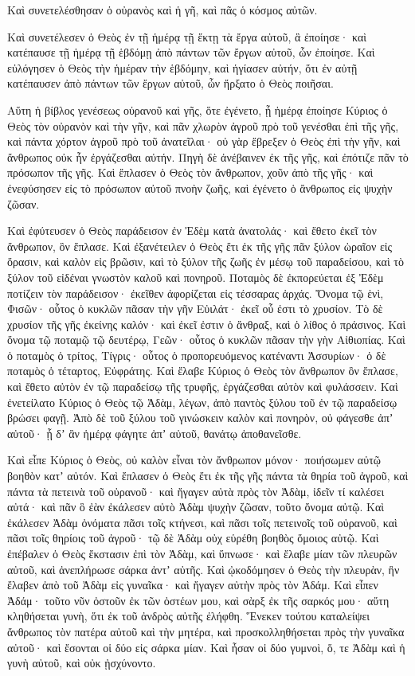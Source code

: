 {Καὶ συνετελέσθησαν ὁ οὐρανὸς καὶ ἡ γῆ, καὶ πᾶς ὁ κόσμος αὐτῶν.
\par }{\PP {}Καὶ συνετέλεσεν ὁ Θεὸς ἐν τῇ ἡμέρᾳ τῇ ἕκτῃ τὰ ἔργα αὐτοῦ, ἃ ἐποίησε· καὶ κατέπαυσε τῇ ἡμέρᾳ τῇ ἑβδόμῃ ἀπὸ πάντων τῶν ἔργων αὐτοῦ, ὧν ἐποίησε.
Καὶ εὐλόγησεν ὁ Θεὸς τὴν ἡμέραν τὴν ἑβδόμην, καὶ ἡγίασεν αὐτήν, ὅτι ἐν αὐτῇ κατέπαυσεν ἀπὸ πάντων τῶν ἔργων αὐτοῦ, ὧν ἤρξατο ὁ Θεὸς ποιῆσαι.
\par }{\PP {}Αὕτη ἡ βίβλος γενέσεως οὐρανοῦ καὶ γῆς, ὅτε ἐγένετο, ᾗ ἡμέρᾳ ἐποίησε Κύριος ὁ Θεὸς τὸν οὐρανὸν καὶ τὴν γῆν,
καὶ πᾶν χλωρὸν ἀγροῦ πρὸ τοῦ γενέσθαι ἐπὶ τῆς γῆς, καὶ πάντα χόρτον ἀγροῦ πρὸ τοῦ ἀνατεῖλαι· οὐ γὰρ ἔβρεξεν ὁ Θεὸς ἐπὶ τὴν γῆν, καὶ ἄνθρωπος οὐκ ἦν ἐργάζεσθαι αὐτήν.
Πηγὴ δὲ ἀνέβαινεν ἐκ τῆς γῆς, καὶ ἐπότιζε πᾶν τὸ πρόσωπον τῆς γῆς.
Καὶ ἔπλασεν ὁ Θεὸς τὸν ἄνθρωπον, χοῦν ἀπὸ τῆς γῆς· καὶ ἐνεφύσησεν εἰς τὸ πρόσωπον αὐτοῦ πνοὴν ζωῆς, καὶ ἐγένετο ὁ ἄνθρωπος εἰς ψυχὴν ζῶσαν.
\par }{\PP {}Καὶ ἐφύτευσεν ὁ Θεὸς παράδεισον ἐν Ἐδὲμ κατὰ ἀνατολάς· καὶ ἔθετο ἐκεῖ τὸν ἄνθρωπον, ὃν ἔπλασε.
Καὶ ἐξανέτειλεν ὁ Θεὸς ἔτι ἐκ τῆς γῆς πᾶν ξύλον ὡραῖον εἰς ὅρασιν, καὶ καλὸν εἰς βρῶσιν, καὶ τὸ ξύλον τῆς ζωῆς ἐν μέσῳ τοῦ παραδείσου, καὶ τὸ ξύλον τοῦ εἰδέναι γνωστὸν καλοῦ καὶ πονηροῦ.
Ποταμὸς δὲ ἐκπορεύεται ἐξ Ἐδὲμ ποτίζειν τὸν παράδεισον· ἐκεῖθεν ἀφορίζεται εἰς τέσσαρας ἀρχάς.
Ὄνομα τῷ ἑνὶ, Φισῶν· οὗτος ὁ κυκλῶν πᾶσαν τὴν γῆν Εὐιλάτ· ἐκεῖ οὗ ἐστι τὸ χρυσίον.
Τὸ δὲ χρυσίον τῆς γῆς ἐκείνης καλόν· καὶ ἐκεῖ ἐστιν ὁ ἄνθραξ, καὶ ὁ λίθος ὁ πράσινος.
Καὶ ὄνομα τῷ ποταμῷ τῷ δευτέρῳ, Γεῶν· οὗτος ὁ κυκλῶν πᾶσαν τὴν γὴν Αἰθιοπίας.
Καὶ ὁ ποταμὸς ὁ τρίτος, Τίγρις· οὗτος ὁ προπορευόμενος κατέναντι Ἀσσυρίων· ὁ δὲ ποταμὸς ὁ τέταρτος, Εὐφράτης.
Καὶ ἔλαβε Κύριος ὁ Θεὸς τὸν ἄνθρωπον ὃν ἔπλασε, καὶ ἔθετο αὐτὸν ἐν τῷ παραδείσῳ τῆς τρυφῆς, ἐργάζεσθαι αὐτὸν καὶ φυλάσσειν.
Καὶ ἐνετείλατο Κύριος ὁ Θεὸς τῷ Ἀδὰμ, λέγων, ἀπὸ παντὸς ξύλου τοῦ ἐν τῷ παραδείσῳ βρώσει φαγῇ.
Ἀπὸ δὲ τοῦ ξύλου τοῦ γινώσκειν καλὸν καὶ πονηρὸν, οὐ φάγεσθε ἀπʼ αὐτοῦ· ᾗ δʼ ἂν ἡμέρᾳ φάγητε ἀπʼ αὐτοῦ, θανάτῳ ἀποθανεῖσθε.
\par }{\PP {}Καὶ εἶπε Κύριος ὁ Θεὸς, οὐ καλὸν εἶναι τὸν ἄνθρωπον μόνον· ποιήσωμεν αὐτῷ βοηθὸν κατʼ αὐτόν.
Καὶ ἔπλασεν ὁ Θεὸς ἔτι ἐκ τῆς γῆς πάντα τὰ θηρία τοῦ ἀγροῦ, καὶ πάντα τὰ πετεινὰ τοῦ οὐρανοῦ· καὶ ἤγαγεν αὐτὰ πρὸς τὸν Ἀδὰμ, ἰδεῖν τί καλέσει αὐτά· καὶ πᾶν ὃ ἐὰν ἐκάλεσεν αὐτὸ Ἀδὰμ ψυχὴν ζῶσαν, τοῦτο ὄνομα αὐτῷ.
Καὶ ἐκάλεσεν Ἀδὰμ ὀνόματα πᾶσι τοῖς κτήνεσι, καὶ πᾶσι τοῖς πετεινοῖς τοῦ οὐρανοῦ, καὶ πᾶσι τοῖς θηρίοις τοῦ ἀγροῦ· τῷ δὲ Ἀδὰμ οὐχ εὑρέθη βοηθὸς ὅμοιος αὐτῷ.
Καὶ ἐπέβαλεν ὁ Θεὸς ἔκστασιν ἐπὶ τὸν Ἀδὰμ, καὶ ὕπνωσε· καὶ ἔλαβε μίαν τῶν πλευρῶν αὐτοῦ, καὶ ἀνεπλήρωσε σάρκα ἀντʼ αὐτῆς.
Καὶ ᾠκοδόμησεν ὁ Θεὸς τὴν πλευρὰν, ἣν ἔλαβεν ἀπὸ τοῦ Ἀδὰμ εἰς γυναῖκα· καὶ ἤγαγεν αὐτὴν πρὸς τὸν Ἀδάμ.
Καὶ εἶπεν Ἀδάμ· τοῦτο νῦν ὀστοῦν ἐκ τῶν ὀστέων μου, καὶ σὰρξ ἐκ τῆς σαρκός μου· αὕτη κληθήσεται γυνὴ, ὅτι ἐκ τοῦ ἀνδρὸς αὐτῆς ἐλήφθη.
Ἕνεκεν τούτου καταλείψει ἄνθρωπος τὸν πατέρα αὐτοῦ καὶ τὴν μητέρα, καὶ προσκολληθήσεται πρὸς τὴν γυναῖκα αὐτοῦ· καὶ ἔσονται οἱ δύο εἰς σάρκα μίαν.
Καὶ ἦσαν οἱ δύο γυμνοὶ, ὅ, τε Ἀδὰμ καὶ ἡ γυνὴ αὐτοῦ, καὶ οὐκ ᾐσχύνοντο.

}
